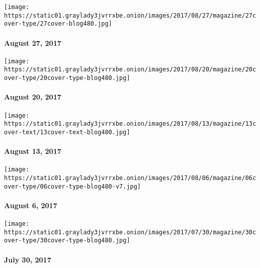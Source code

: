\href{https://www.nytimes3xbfgragh.onion/issue/magazine/2017/08/25/the-82717-issue}{}

\texttt{[image: https://static01.graylady3jvrrxbe.onion/images/2017/08/27/magazine/27cover-type/27cover-blog480.jpg]}

\hypertarget{august-27-2017}{%
\paragraph{August 27, 2017}\label{august-27-2017}}

\href{https://www.nytimes3xbfgragh.onion/issue/magazine/2017/08/18/82017-issue}{}

\texttt{[image: https://static01.graylady3jvrrxbe.onion/images/2017/08/20/magazine/20cover-type/20cover-type-blog480.jpg]}

\hypertarget{august-20-2017}{%
\paragraph{August 20, 2017}\label{august-20-2017}}

\href{https://www.nytimes3xbfgragh.onion/issue/magazine/2017/08/10/the-81317-issue}{}

\texttt{[image: https://static01.graylady3jvrrxbe.onion/images/2017/08/13/magazine/13cover-text/13cover-text-blog480.jpg]}

\hypertarget{august-13-2017}{%
\paragraph{August 13, 2017}\label{august-13-2017}}

\href{https://www.nytimes3xbfgragh.onion/issue/magazine/2017/08/04/magazine-index}{}

\texttt{[image: https://static01.graylady3jvrrxbe.onion/images/2017/08/06/magazine/06cover-type/06cover-type-blog480-v7.jpg]}

\hypertarget{august-6-2017}{%
\paragraph{August 6, 2017}\label{august-6-2017}}

\href{https://www.nytimes3xbfgragh.onion/issue/magazine/2017/07/28/magazine-index}{}

\texttt{[image: https://static01.graylady3jvrrxbe.onion/images/2017/07/30/magazine/30cover-type/30cover-type-blog480.jpg]}

\hypertarget{july-30-2017}{%
\paragraph{July 30, 2017}\label{july-30-2017}}

